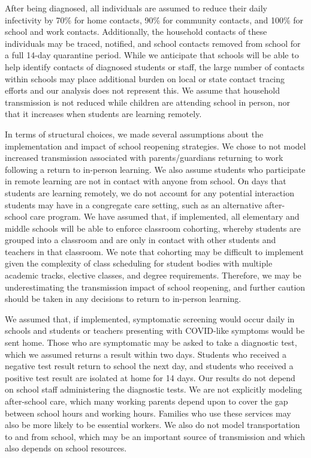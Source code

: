 \documentclass[preprint,12pt]{elsarticle}
\begin{document}
After being diagnosed, all individuals are assumed to reduce their daily infectivity by 70\% for home contacts, 90\% for community contacts, and 100\% for school and work contacts. Additionally, the household contacts of these individuals may be traced, notified, and school contacts removed from school for a full 14-day quarantine period. While we anticipate that schools will be able to help identify contacts of diagnosed students or staff, the large number of contacts within schools may place additional burden on local or state contact tracing efforts and our analysis does not represent this. We assume that household transmission is not reduced while children are attending school in person, nor that it increases when students are learning remotely.

In terms of structural choices, we made several assumptions about the implementation and impact of school reopening strategies. We chose to not model increased transmission associated with parents/guardians returning to work following a return to in-person learning. We also assume students who participate in remote learning are not in contact with anyone from school. On days that students are learning remotely, we do not account for any potential interaction students may have in a congregate care setting, such as an alternative after-school care program. We have assumed that, if implemented, all elementary and middle schools will be able to enforce classroom cohorting, whereby students are grouped into a classroom and are only in contact with other students and teachers in that classroom. We note that cohorting may be difficult to implement given the complexity of class scheduling for student bodies with multiple academic tracks, elective classes, and degree requirements. Therefore, we may be underestimating the transmission impact of school reopening, and further caution should be taken in any decisions to return to in-person learning.

We assumed that, if implemented, symptomatic screening would occur daily in schools and students or teachers presenting with COVID-like symptoms would be sent home. Those who are symptomatic may be asked to take a diagnostic test, which we assumed returns a result within two days. Students who received a negative test result return to school the next day, and students who received a positive test result are isolated at home for 14 days. Our results do not depend on school staff administering the diagnostic tests. We are not explicitly modeling after-school care, which many working parents depend upon to cover the gap between school hours and working hours. Families who use these services may also be more likely to be essential workers. We also do not model transportation to and from school, which may be an important source of transmission and which also depends on school resources.
\end{document}
